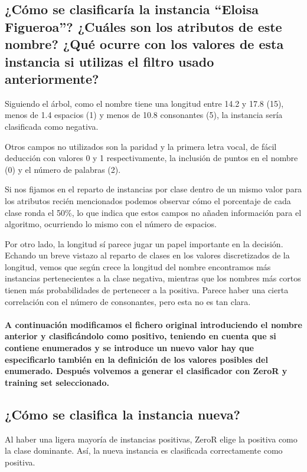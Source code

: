 \documentclass[12pt]{article}
\begin{document}
\subsection*{\small ¿Cómo se clasificaría la instancia ``Eloisa Figueroa''?
¿Cuáles son los atributos de este nombre? ¿Qué ocurre con los valores de esta
instancia si utilizas el filtro usado anteriormente?}

Siguiendo el árbol, como el nombre tiene una longitud entre 14.2 y 17.8 (15),
menos de 1.4 espacios (1) y menos de 10.8 consonantes (5), la instancia sería
clasificada como negativa.

Otros campos no utilizados son la paridad y la primera letra vocal, de fácil
deducción con valores 0 y 1 respectivamente, la inclusión de puntos en el
nombre (0) y el número de palabras (2).

Si nos fijamos en el reparto de instancias por clase dentro de un mismo valor
para los atributos recién mencionados podemos observar cómo el porcentaje de
cada clase ronda el 50\%, lo que indica que estos campos no añaden información
para el algoritmo, ocurriendo lo mismo con el número de espacios.

Por otro lado, la longitud sí parece jugar un papel importante en la decisión.
Echando un breve vistazo al reparto de clases en los valores discretizados de la
longitud, vemos que según crece la longitud del nombre encontramos más
instancias pertenecientes a la clase negativa, mientras que los nombres más
cortos tienen más probabilidades de pertenecer a la positiva. Parece haber una
cierta correlación con el número de consonantes, pero esta no es tan clara.

\paragraph{\small A continuación modificamos el fichero original introduciendo
el nombre anterior y clasificándolo como positivo, teniendo en cuenta que
si contiene enumerados y se introduce un nuevo valor hay que especificarlo
también en la definición de los valores posibles del enumerado. Después
volvemos a generar el clasificador con ZeroR y training set seleccionado.}

\subsection*{\small ¿Cómo se clasifica la instancia nueva?}

Al haber una ligera mayoría de instancias positivas, ZeroR elige la positiva
como la clase dominante. Así, la nueva instancia es clasificada correctamente
como positiva.
\end{document}
